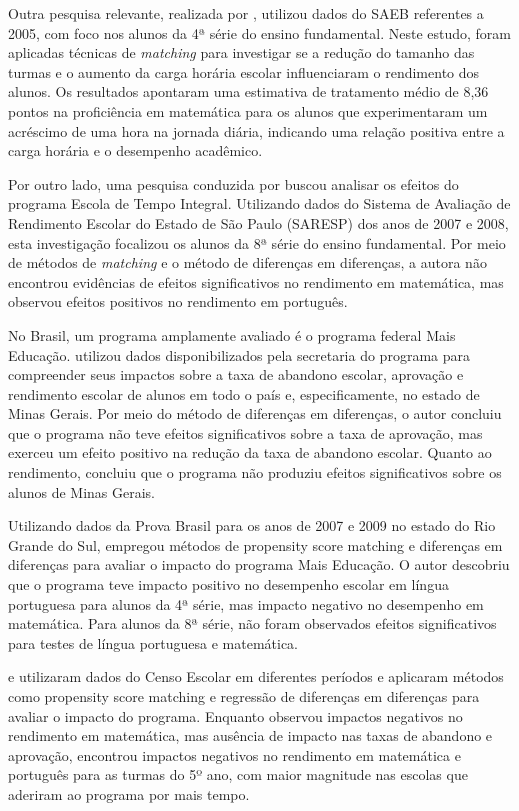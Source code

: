 Outra pesquisa relevante, realizada por \cite{Oliveira_2008}, utilizou dados do SAEB referentes a 2005, com foco nos alunos da 4ª série do ensino fundamental. Neste estudo, foram aplicadas técnicas de \textit{matching} para investigar se a redução do tamanho das turmas e o aumento da carga horária escolar influenciaram o rendimento dos alunos. Os resultados apontaram uma estimativa de tratamento médio de 8,36 pontos na proficiência em matemática para os alunos que experimentaram um acréscimo de uma hora na jornada diária, indicando uma relação positiva entre a carga horária e o desempenho acadêmico.

Por outro lado, uma pesquisa conduzida por \cite{Aquino_2011} buscou analisar os efeitos do programa Escola de Tempo Integral. Utilizando dados do Sistema de Avaliação de Rendimento Escolar do Estado de São Paulo (SARESP) dos anos de 2007 e 2008, esta investigação focalizou os alunos da 8ª série do ensino fundamental. Por meio de métodos de \textit{matching} e o método de diferenças em diferenças, a autora não encontrou evidências de efeitos significativos no rendimento em matemática, mas observou efeitos positivos no rendimento em português.

No Brasil, um programa amplamente avaliado é o programa federal Mais Educação. \cite{Pereira_2011} utilizou dados disponibilizados pela secretaria do programa para compreender seus impactos sobre a taxa de abandono escolar, aprovação e rendimento escolar de alunos em todo o país e, especificamente, no estado de Minas Gerais. Por meio do método de diferenças em diferenças, o autor concluiu que o programa não teve efeitos significativos sobre a taxa de aprovação, mas exerceu um efeito positivo na redução da taxa de abandono escolar. Quanto ao rendimento, concluiu que o programa não produziu efeitos significativos sobre os alunos de Minas Gerais.

Utilizando dados da Prova Brasil para os anos de 2007 e 2009 no estado do Rio Grande do Sul, \cite{Xerxenevsky_2012} empregou métodos de propensity score matching e diferenças em diferenças para avaliar o impacto do programa Mais Educação. O autor descobriu que o programa teve impacto positivo no desempenho escolar em língua portuguesa para alunos da 4ª série, mas impacto negativo no desempenho em matemática. Para alunos da 8ª série, não foram observados efeitos significativos para testes de língua portuguesa e matemática.

\cite{Almeida_2016} e \cite{Gandra_2017} utilizaram dados do Censo Escolar em diferentes períodos e aplicaram métodos como propensity score matching e regressão de diferenças em diferenças para avaliar o impacto do programa. Enquanto \cite{Almeida_2016} observou impactos negativos no rendimento em matemática, mas ausência de impacto nas taxas de abandono e aprovação, \cite{Gandra_2017} encontrou impactos negativos no rendimento em matemática e português para as turmas do 5º ano, com maior magnitude nas escolas que aderiram ao programa por mais tempo.

